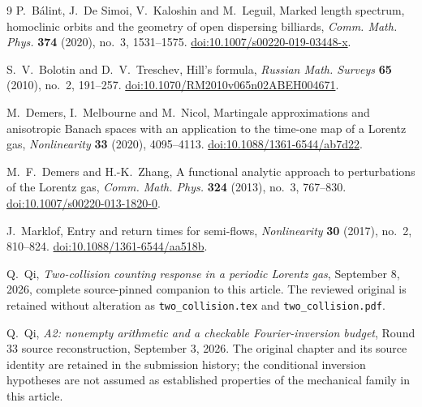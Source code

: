 \begin{thebibliography}{9}
P.~B\'alint, J.~De Simoi, V.~Kaloshin and M.~Leguil,
Marked length spectrum, homoclinic orbits and the geometry of open
dispersing billiards, \emph{Comm. Math. Phys.} \textbf{374} (2020),
no.~3, 1531--1575.
\href{https://doi.org/10.1007/s00220-019-03448-x}{doi:10.1007/s00220-019-03448-x}.

S.~V.~Bolotin and D.~V.~Treschev, Hill's formula,
\emph{Russian Math. Surveys} \textbf{65} (2010), no.~2, 191--257.
\href{https://doi.org/10.1070/RM2010v065n02ABEH004671}{doi:10.1070/RM2010v065n02ABEH004671}.

M.~Demers, I.~Melbourne and M.~Nicol, Martingale approximations and
anisotropic Banach spaces with an application to the time-one map of a
Lorentz gas, \emph{Nonlinearity} \textbf{33} (2020), 4095--4113.
\href{https://doi.org/10.1088/1361-6544/ab7d22}{doi:10.1088/1361-6544/ab7d22}.

M.~F.~Demers and H.-K.~Zhang, A functional analytic approach to
perturbations of the Lorentz gas, \emph{Comm. Math. Phys.}
\textbf{324} (2013), no.~3, 767--830.
\href{https://doi.org/10.1007/s00220-013-1820-0}{doi:10.1007/s00220-013-1820-0}.

J.~Marklof, Entry and return times for semi-flows,
\emph{Nonlinearity} \textbf{30} (2017), no.~2, 810--824.
\href{https://doi.org/10.1088/1361-6544/aa518b}{doi:10.1088/1361-6544/aa518b}.

Q.~Qi, \emph{Two-collision counting response in a periodic Lorentz gas},
September 8, 2026, complete source-pinned companion to this article.
The reviewed original is retained without alteration as
\texttt{two\_collision.tex} and \texttt{two\_collision.pdf}.

Q.~Qi, \emph{A2: nonempty arithmetic and a checkable Fourier-inversion
budget}, Round 33 source reconstruction, September 3, 2026.
The original chapter and its source identity are retained in the
submission history; the conditional inversion hypotheses are not assumed
as established properties of the mechanical family in this article.
\end{thebibliography}
